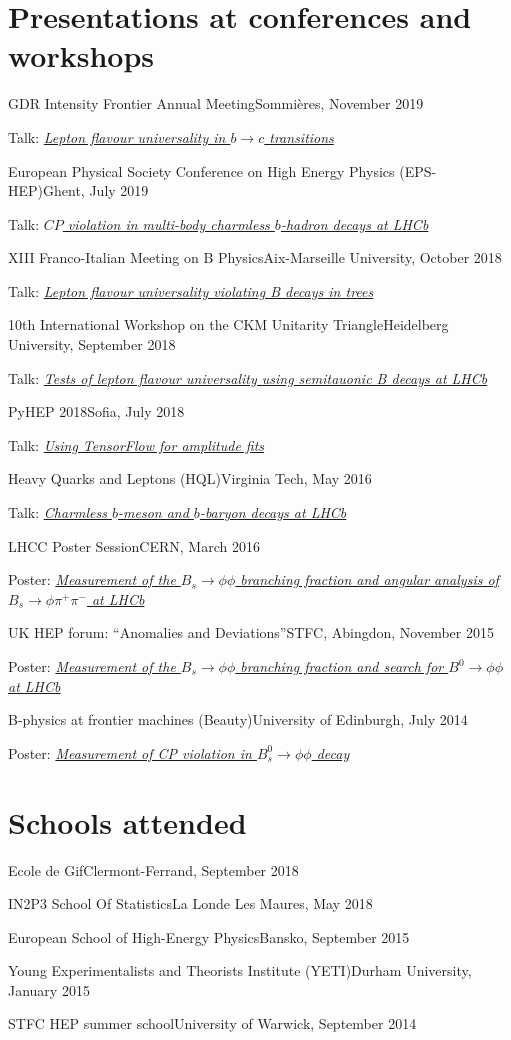 \documentclass[contbibnum,titleabove]{simplecv}
\newcommand\dateditem[2]{\vspace{0.5em}#1\hfill#2\par}
\newcommand\topictitle[3]{\par\dateditem{#1}{#3}{\color{darkgray}#2}}
\begin{document}
	\section{Presentations at conferences and workshops}
	\topictitle{GDR Intensity Frontier Annual Meeting}{Talk: \href{https://indico.in2p3.fr/event/19597/contributions/75554/}{\textit{Lepton flavour universality in $b \to c$ transitions}}}{Sommi\`eres, November 2019}
	\topictitle{European Physical Society Conference on High Energy Physics (EPS-HEP)}{Talk: \href{https://indico.cern.ch/event/577856/contributions/3422393/}{\textit{$C\!P$ violation in multi-body charmless $b$-hadron decays at LHCb}}}{Ghent, July 2019}
	\topictitle{XIII Franco-Italian Meeting on B Physics}{Talk: \href{https://indico.cern.ch/event/725682/contributions/3095135/}{\textit{Lepton flavour universality violating B decays in trees}}}{Aix-Marseille University, October 2018}
	\topictitle{10th International Workshop on the CKM Unitarity Triangle}{Talk: \href{https://indico.cern.ch/event/684284/contributions/3007444/}{\textit{Tests of lepton flavour universality using semitauonic B decays at LHCb}}}{Heidelberg University, September 2018}
	\topictitle{PyHEP 2018}{Talk: \href{https://indico.cern.ch/event/694818/contributions/2986396/}{\textit{Using TensorFlow for amplitude fits}}}{Sofia, July 2018}
	\topictitle{Heavy Quarks and Leptons (HQL)}{Talk: \href{https://indico.phys.vt.edu/event/31/contributions/542/}{\textit{Charmless $b$-meson and $b$-baryon decays at LHCb}}}{Virginia Tech, May 2016}
	\topictitle{LHCC Poster Session}{Poster: \href{https://cds.cern.ch/record/2137997/} {\textit{Measurement of the $B_s \to \phi \phi$ branching fraction and angular analysis of $B_s \to \phi \pi^{+} \pi^{-}$ at LHCb}}}{CERN, March 2016}
	\topictitle{UK HEP forum: ``Anomalies and Deviations''}{Poster: \href{https://hepwww.pp.rl.ac.uk/groups/accel/forum/2015/poster_session.html}{\textit{Measurement of the $B_s \to \phi \phi$ branching fraction and search for $B^0 \to \phi \phi$ at LHCb}}}{STFC, Abingdon, November 2015}
	\topictitle{B-physics at frontier machines (Beauty)}{Poster: \href{https://indico.cern.ch/event/308116/contributions/1679397/}{\textit{Measurement of CP violation in $B^0_s \to \phi\phi$ decay}}}{University of Edinburgh, July 2014}
	\section{Schools attended}
	\topictitle{Ecole de Gif}{}{Clermont-Ferrand, September 2018}
	\topictitle{IN2P3 School Of Statistics}{}{La Londe Les Maures, May 2018}
	\topictitle{European School of High-Energy Physics}{}{Bansko, September 2015}
	\topictitle{Young Experimentalists and Theorists Institute (YETI)}{}{Durham University, January 2015}
	\topictitle{STFC HEP summer school}{}{University of Warwick, September 2014}
\end{document}
